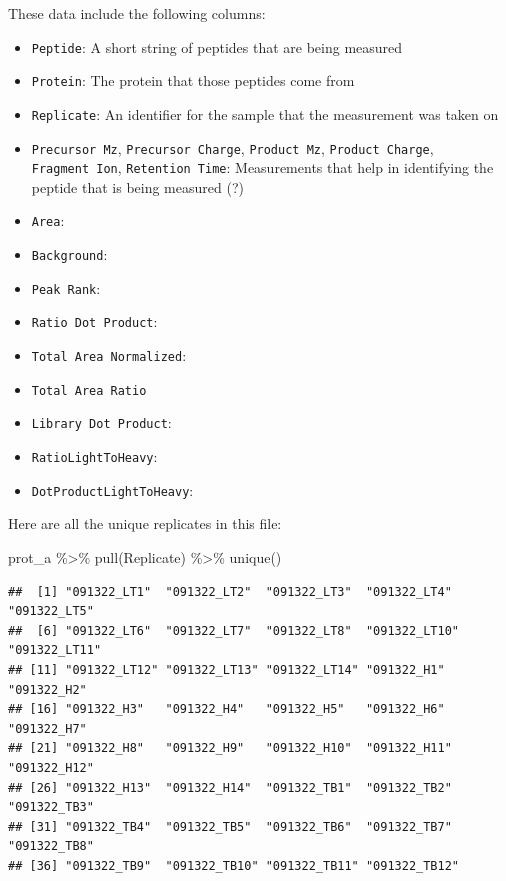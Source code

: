 \documentclass[
]{book}
\newenvironment{Shaded}{\begin{snugshade}}{\end{snugshade}}
\newcommand{\FunctionTok}[1]{\textcolor[rgb]{0.00,0.00,0.00}{#1}}
\newcommand{\NormalTok}[1]{#1}
\newcommand{\SpecialCharTok}[1]{\textcolor[rgb]{0.00,0.00,0.00}{#1}}
\providecommand{\tightlist}{%
  \setlength{\itemsep}{0pt}\setlength{\parskip}{0pt}}
\begin{document}
These data include the following columns:

\begin{itemize}
\tightlist
\item
  \texttt{Peptide}: A short string of peptides that are being measured
\item
  \texttt{Protein}: The protein that those peptides come from
\item
  \texttt{Replicate}: An identifier for the sample that the measurement was taken on
\item
  \texttt{Precursor\ Mz}, \texttt{Precursor\ Charge}, \texttt{Product\ Mz}, \texttt{Product\ Charge},
  \texttt{Fragment\ Ion}, \texttt{Retention\ Time}: Measurements that help in identifying the peptide
  that is being measured (?)
\item
  \texttt{Area}:
\item
  \texttt{Background}:
\item
  \texttt{Peak\ Rank}:
\item
  \texttt{Ratio\ Dot\ Product}:
\item
  \texttt{Total\ Area\ Normalized}:
\item
  \texttt{Total\ Area\ Ratio}
\item
  \texttt{Library\ Dot\ Product}:
\item
  \texttt{RatioLightToHeavy}:
\item
  \texttt{DotProductLightToHeavy}:
\end{itemize}

Here are all the unique replicates in this file:

\begin{Shaded}
\begin{Highlighting}[]
\NormalTok{prot\_a }\SpecialCharTok{\%\textgreater{}\%} 
  \FunctionTok{pull}\NormalTok{(Replicate) }\SpecialCharTok{\%\textgreater{}\%} 
  \FunctionTok{unique}\NormalTok{()}
\end{Highlighting}
\end{Shaded}

\begin{verbatim}
##  [1] "091322_LT1"  "091322_LT2"  "091322_LT3"  "091322_LT4"  "091322_LT5" 
##  [6] "091322_LT6"  "091322_LT7"  "091322_LT8"  "091322_LT10" "091322_LT11"
## [11] "091322_LT12" "091322_LT13" "091322_LT14" "091322_H1"   "091322_H2"  
## [16] "091322_H3"   "091322_H4"   "091322_H5"   "091322_H6"   "091322_H7"  
## [21] "091322_H8"   "091322_H9"   "091322_H10"  "091322_H11"  "091322_H12" 
## [26] "091322_H13"  "091322_H14"  "091322_TB1"  "091322_TB2"  "091322_TB3" 
## [31] "091322_TB4"  "091322_TB5"  "091322_TB6"  "091322_TB7"  "091322_TB8" 
## [36] "091322_TB9"  "091322_TB10" "091322_TB11" "091322_TB12"
\end{verbatim}
\end{document}
